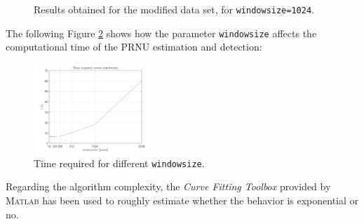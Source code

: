 \documentclass[a4paper, 11pt]{article}
\begin{document}
\begin{figure}[H]
	\centering
	\caption{Results obtained for the modified data set, for \texttt{windowsize=1024}.}
	\label{fig:modifieddataset512}
\end{figure}

The following Figure \ref{fig:timerequired} shows how the parameter \texttt{windowsize} affects the computational time of the PRNU estimation and detection:
\begin{figure}[H]
	\centering
	\includegraphics[width=0.4\textwidth]{timerequired}
	\caption{Time required for different \texttt{windowsize}.}
	\label{fig:timerequired}
\end{figure}

Regarding the algorithm complexity, the \textit{Curve Fitting Toolbox} provided by \textsc{Matlab} has been used to roughly estimate whether the behavior is exponential or no.
\end{document}
